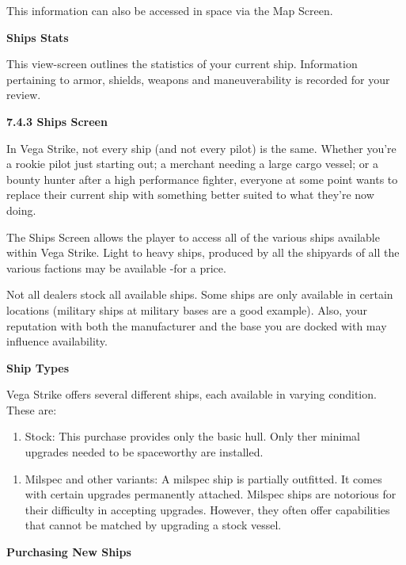 \documentclass{article}
\begin{document}
This information can also be accessed in space via the Map Screen. 

\textbf{}

\textbf{Ships Stats }

This view-screen outlines the statistics of your current ship. Information pertaining to armor, shields, weapons and maneuverability is recorded for your review. 





\textbf{7.4.3 Ships Screen }

In Vega Strike, not every ship (and not every pilot) is the same. Whether you're a rookie pilot just starting out; a merchant needing a large cargo vessel; or a bounty hunter after a high performance fighter, everyone at some point wants to replace their current ship with something better suited to what they're now doing. 

The Ships Screen allows the player to access all of the various ships available within Vega Strike. Light to heavy ships, produced by all the shipyards of all the various factions may be available -for a price. 

Not all dealers stock all available ships. Some ships are only available in certain locations (military ships at military bases are a good example). Also, your reputation with both the manufacturer and the base you are docked with may influence availability. 

\textbf{Ship Types }

Vega Strike offers several different ships, each available in varying condition. These are: 

\begin{enumerate}
\item  Stock: This purchase provides only the basic hull. Only ther minimal  upgrades needed to be spaceworthy are installed.
\end{enumerate}



\begin{enumerate}
\item  Milspec and other variants: A milspec ship is partially outfitted. It comes with certain upgrades permanently attached. Milspec ships are notorious for their difficulty in accepting upgrades. However, they often offer capabilities that cannot be matched by upgrading a stock vessel. 
\end{enumerate}



\textbf{Purchasing New Ships }
\end{document}
